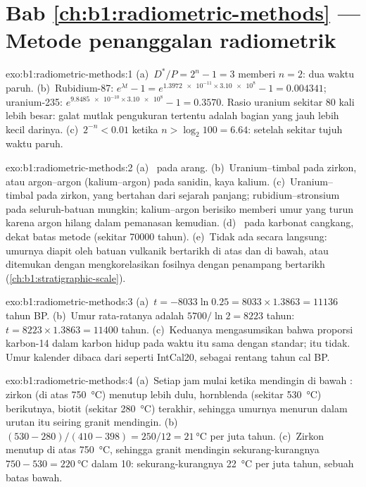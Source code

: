\section*{Bab \ref{ch:b1:radiometric-methods} --- Metode penanggalan radiometrik}

\begin{solution}{exo:b1:radiometric-methods:1}
(a)~$D^*/P = 2^n - 1 = 3$ memberi $n = 2$: dua waktu paruh. (b)~Rubidium-87:
$e^{\lambda t} - 1 = e^{\num{1.3972e-11} \times \num{3.10e8}} - 1 = 0.004341$;
uranium-235: $e^{\num{9.8485e-10} \times \num{3.10e8}} - 1 = 0.3570$. Rasio uranium
sekitar 80 kali lebih besar: galat mutlak pengukuran tertentu adalah bagian yang jauh
lebih kecil darinya. (c)~$2^{-n} < 0.01$ ketika $n > \log_2 100 = 6.64$: setelah
sekitar tujuh waktu paruh.
\end{solution}

\begin{solution}{exo:b1:radiometric-methods:2}
(a)~ pada arang. (b)~Uranium--timbal pada zirkon, atau argon--argon
(kalium--argon) pada sanidin,  kaya kalium. (c)~Uranium--timbal pada zirkon, yang
bertahan dari sejarah panjang; rubidium--stronsium pada seluruh-batuan mungkin; kalium--argon
berisiko memberi umur yang turun karena argon hilang dalam pemanasan kemudian. (d)~
pada karbonat cangkang, dekat batas metode (sekitar \num{70000} tahun). (e)~Tidak ada
secara langsung: umurnya diapit oleh batuan vulkanik bertarikh di atas dan di bawah, atau
ditemukan dengan mengkorelasikan fosilnya dengan penampang bertarikh (\cref{ch:b1:stratigraphic-scale}).
\end{solution}

\begin{solution}{exo:b1:radiometric-methods:3}
(a)~$t = -8033 \ln 0.25 = 8033 \times 1.3863 = \num{11136}$ tahun BP.
(b)~Umur rata-ratanya adalah $5700/\ln 2 = \num{8223}$ tahun: $t = 8223 \times 1.3863 =
\num{11400}$ tahun. (c)~Keduanya mengasumsikan bahwa proporsi karbon-14 dalam karbon hidup
pada waktu itu sama dengan standar; itu tidak. Umur kalender dibaca dari 
seperti IntCal20, sebagai rentang tahun cal BP.
\end{solution}

\begin{solution}{exo:b1:radiometric-methods:4}
(a)~Setiap jam mulai ketika  mendingin di bawah : zirkon (di
atas \qty{750}{\celsius}) menutup lebih dulu, hornblenda (sekitar \qty{530}{\celsius})
berikutnya, biotit (sekitar \qty{280}{\celsius}) terakhir, sehingga umurnya menurun dalam
urutan itu seiring granit mendingin. (b)~$(530 - 280)/(410 - 398) =
250/12 = \qty{21}{\celsius}$ per juta tahun. (c)~Zirkon menutup di atas
\qty{750}{\celsius}, sehingga granit mendingin sekurang-kurangnya $750 - 530 =
\qty{220}{\celsius}$ dalam \qty{10}{\Ma}: sekurang-kurangnya \qty{22}{\celsius} per juta
tahun, sebuah batas bawah.
\end{solution}

